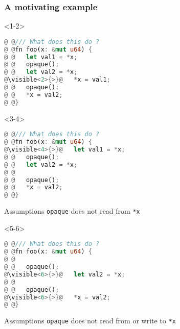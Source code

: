 \begin{frame}[fragile,t]
    \frametitle{A motivating example}
    \begin{onlyenv}<1-2>
        \begin{block}{}
            \begin{minipage}{\textwidth}
                \begin{lstlisting}[language=rust, escapechar=@]
@ @/// What does this do ?
@ @fn foo(x: &mut u64) {
@ @   let val1 = *x;
@ @   opaque();
@ @   let val2 = *x;
@\visible<2>{>}@   *x = val1;
@ @   opaque();
@ @   *x = val2;
@ @}
                \end{lstlisting}
            \end{minipage}
        \end{block}
    \end{onlyenv}

    \begin{onlyenv}<3-4>
        \begin{block}{}
            \begin{minipage}{\textwidth}
                \begin{lstlisting}[language=rust, escapechar=@]
@ @/// What does this do ?
@ @fn foo(x: &mut u64) {
@\visible<4>{>}@   let val1 = *x;
@ @   opaque();
@ @   let val2 = *x;
@ @
@ @   opaque();
@ @   *x = val2;
@ @}
                \end{lstlisting}
            \end{minipage}
        \end{block}
        \begin{block}{Assumptions}
            \texttt{opaque} does not read from \texttt{*x}
        \end{block}
    \end{onlyenv}

    \begin{onlyenv}<5-6>
        \begin{block}{}
            \begin{minipage}{\textwidth}
                \begin{lstlisting}[language=rust, escapechar=@]
@ @/// What does this do ?
@ @fn foo(x: &mut u64) {
@ @
@ @   opaque();
@\visible<6>{>}@   let val2 = *x;
@ @
@ @   opaque();
@\visible<6>{>}@   *x = val2;
@ @}
                \end{lstlisting}
            \end{minipage}
        \end{block}
        \begin{block}{Assumptions}
            \texttt{opaque} does not read from or write to \texttt{*x}
        \end{block}
    \end{onlyenv}


\end{frame}
